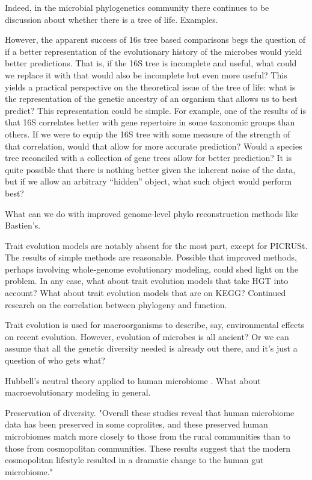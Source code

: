\documentclass{amsart}
\begin{document}
Indeed, in the microbial phylogenetics community there continues to be discussion about whether there is a tree of life.
Examples.

However, the apparent success of 16s tree based comparisons begs the question of if a better representation of the evolutionary history of the microbes would yield better predictions.
That is, if the 16S tree is incomplete and useful, what could we replace it with that would also be incomplete but even more useful?
This yields a practical perspective on the theoretical issue of the tree of life: what is the representation of the genetic ancestry of an organism that allows us to best predict?
This representation could be simple.
For example, one of the results of \citet{zaneveld2010ribosomal} is that 16S correlates better with gene repertoire in some taxonomic groups than others.
If we were to equip the 16S tree with some measure of the strength of that correlation, would that allow for more accurate prediction?
Would a species tree reconciled with a collection of gene trees allow for better prediction?
It is quite possible that there is nothing better given the inherent noise of the data, but if we allow an arbitrary ``hidden'' object, what such object would perform best?

What can we do with improved genome-level phylo reconstruction methods like Bastien's.

Trait evolution models are notably absent for the most part, except for PICRUSt.
The results of simple methods are reasonable.
Possible that improved methods, perhaps involving whole-genome evolutionary modeling, could shed light on the problem.
In any case, what about trait evolution models that take HGT into account?
What about trait evolution models that are on KEGG?
Continued research on the correlation between phylogeny and function.

Trait evolution is used for macroorganisms to describe, say, environmental effects on recent evolution.
However, evolution of microbes is all ancient?
Or we can assume that all the genetic diversity needed is already out there, and it's just a question of who gets what?

Hubbell's neutral theory applied to human microbiome \citep{fierer2012animalcules,costello2012application}.
What about macroevolutionary modeling in general.

Preservation of diversity.
"Overall these studies reveal that human microbiome data has been preserved in some coprolites, and these preserved human microbiomes match more closely to those from the rural communities than to those from cosmopolitan communities. These results suggest that the modern cosmopolitan lifestyle resulted in a dramatic change to the human gut microbiome."
\end{document}
